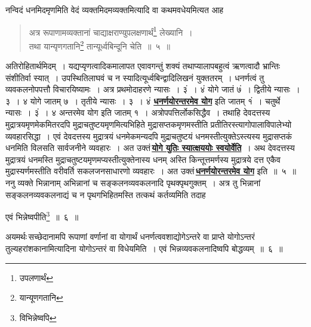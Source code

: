 \documentclass[11pt, openany]{book}
\begin{document}
\vspace{-4mm}
\indent नन्विदं धनमिदमृणमिति वेदं व्यक्तमिदमव्यक्तमित्यादि वा कथमवधेयमित्यत
आह\textendash 
 \newpage
\begin{quote}
    \ab
    अत्र रूपाणामव्यक्तानां चाद्याक्षराण्युपलक्षणार्थं\renewcommand{\thefootnote}{1}\footnote{उपलणार्थं} लेख्यानि~।\\
 तथा यान्यृणगतानि\renewcommand{\thefootnote}{2}\footnote{यान्यूणगतानि} तान्यूर्ध्वबिन्दूनि चेति~॥~५~॥
\end{quote}
 
अतिरोहितार्थमिदम्~। यद्यप्यृणत्वादिकमालापत एवावगन्तुं शक्यं तथाप्यालापबहुत्वं ऋणत्वादौ भ्रान्तिः संशीतिर्वा स्यात्~। उपस्थितिलाघवं च
न स्यादित्यूर्ध्वबिन्द्वादिलिखनं युक्ततरम्~। धनर्णत्वं तु व्यवकलनोपपत्तौ
विचारयिष्यामः~। अत्र प्रथमोदाहरणे न्यासः~। ३ं~। ४ं योगे जातं ७ं~।
द्वितीये न्यासः~। ३~। ४ योगे जातम् ७~। तृतीये न्यासः~। ३~। ४ं
\hyperref[3]{\textbf{धनर्णयोरन्तरमेव योग}} इति जातम् १ं~। चतुर्थे न्यासः~। ३ं~। ४ अन्तरमेव योग इति जातम्
१~। अत्रोपपत्तिर्लोकसिद्धैव~। तथाहि देवदत्तस्य मुद्रात्रयमृणमेकमितरदपि
मुद्राचतुष्टयमृणमित्यभिहिते मुद्रासप्तकमृणमस्तीति प्रतीतिरस्त्यागोपालाविपालेभ्यो
व्यवहारसिद्धा~। एवं देवदत्तस्य मुद्रात्रयं धनमेकमन्यदपि मुद्राचतुष्टयं
धनमस्तीत्युक्तेऽस्त्यस्य मुद्रासप्तकं धनमिति विलसति सार्वजनीने व्यवहारः~। अत उक्तं\textendash \,\hyperref[3]{\textbf{योगे युतिः स्यात्क्षययोः स्वयोर्वेति}}~। अथ देवदत्तस्य मुद्रात्रयं धनमस्ति मुद्राचतुष्टयमृणमप्यस्तीत्युक्तेनास्य धनम् अस्ति किन्तूत्तमर्णस्य
मुद्रात्रये दत्त एकैव मुद्रास्यर्णमस्तीति वरीवर्ति सकलजनसाधारणो व्यवहारः~। 
अत उक्तं\textendash \,\hyperref[3]{\textbf{धनर्णयोरन्तरमेव योग}} इति~॥~५~॥~\\

 \vspace{-4mm}
 ननु व्यक्ते भिन्नानाम् अभिन्नानां च सङ्कलनव्यवकलनादि पृथक्पृथगुक्तम्~।
अत्र तु भिन्नानां सङ्कलनव्यवकलनाद्यं च न पृथगभिहितमस्ति तत्कथं कर्तव्यमिति
तदाह\textendash 
\vspace{1mm}

\begin{center}
    \ab
     एवं भिन्नेष्वपीति\renewcommand{\thefootnote}{3}\footnote{विभिन्नेष्वपि}~॥~६~॥
\end{center}
 
अयमर्थः\textendash \,सच्छेदानामपि रूपाणां वर्णानां वा योगार्थं धनर्णत्ववशाद्योगेऽन्तरे वा प्राप्ते योगोऽन्तरं तुल्यहरांशकानामित्यादिना योगोऽन्तरं
वा विधेयमिति~। एवं भिन्नव्यवकलनादिष्वपि बोद्धव्यम्~॥~६~॥
 \newpage %
\end{document}

